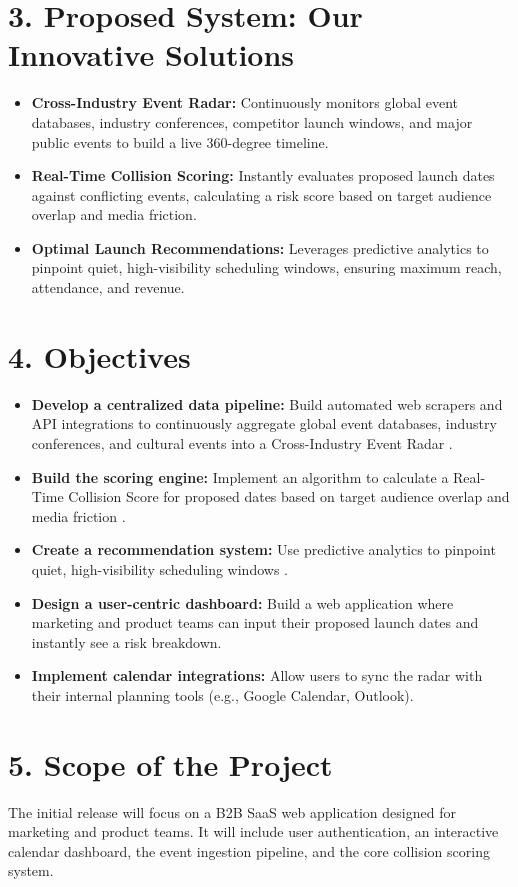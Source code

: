 \documentclass[12pt]{article}
\begin{document}
\section*{3. Proposed System: Our Innovative Solutions}
\begin{itemize}[leftmargin=*]
    \item \textbf{Cross-Industry Event Radar:} Continuously monitors global event databases, industry conferences, competitor launch windows, and major public events to build a live 360-degree timeline.
    \item \textbf{Real-Time Collision Scoring:} Instantly evaluates proposed launch dates against conflicting events, calculating a risk score based on target audience overlap and media friction.
    \item \textbf{Optimal Launch Recommendations:} Leverages predictive analytics to pinpoint quiet, high-visibility scheduling windows, ensuring maximum reach, attendance, and revenue.
\end{itemize}

\section*{4. Objectives}
\begin{itemize}[leftmargin=*]
    \item \textbf{Develop a centralized data pipeline:} Build automated web scrapers and API integrations to continuously aggregate global event databases, industry conferences, and cultural events into a Cross-Industry Event Radar .
    \item \textbf{Build the scoring engine:} Implement an algorithm to calculate a Real-Time Collision Score for proposed dates based on target audience overlap and media friction .
    \item \textbf{Create a recommendation system:} Use predictive analytics to pinpoint quiet, high-visibility scheduling windows .
    \item \textbf{Design a user-centric dashboard:} Build a web application where marketing and product teams can input their proposed launch dates and instantly see a risk breakdown.
    \item \textbf{Implement calendar integrations:} Allow users to sync the radar with their internal planning tools (e.g., Google Calendar, Outlook).
\end{itemize}

\section*{5. Scope of the Project}
The initial release will focus on a B2B SaaS web application designed for marketing and product teams. It will include user authentication, an interactive calendar dashboard, the event ingestion pipeline, and the core collision scoring system.
\end{document}
